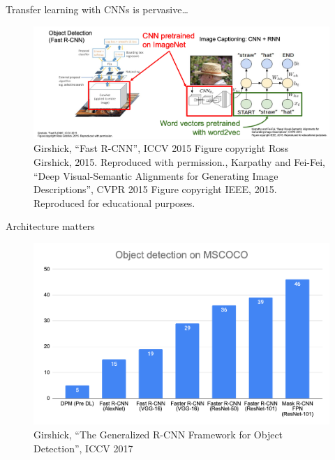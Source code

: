 \documentclass[serif, aspectratio=169]{beamer}
\begin{document}
\begin{frame}{Transfer learning with CNNs is pervasive…}
	\begin{figure}[htpb]
		\begin{center}
			\includegraphics[keepaspectratio, scale=0.25]{pic/TL_examples2}
			\caption*{\scriptsize Girshick, “Fast R-CNN”, ICCV 2015 Figure copyright Ross Girshick, 2015. Reproduced with permission., Karpathy and Fei-Fei, “Deep Visual-Semantic Alignments for Generating Image Descriptions”, CVPR 2015 Figure copyright IEEE, 2015. Reproduced for educational purposes.}
		\end{center}
	\end{figure}
\end{frame}

\begin{frame}{Architecture matters}
	\begin{figure}[htpb]
		\begin{center}
			\includegraphics[keepaspectratio, scale=0.25]{pic/od_mscoco}
			\captionsetup{justification=centering}
			\caption*{\scriptsize Girshick, “The Generalized R-CNN Framework for Object Detection”, ICCV 2017}
		\end{center}
	\end{figure}
\end{frame}
\end{document}
